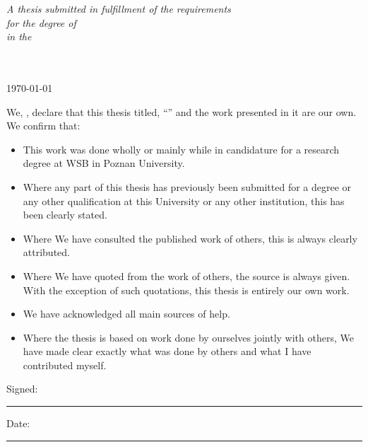 \documentclass[
    11pt,
    english, %
    singlespacing, %
    headsepline, %
    oneside, %
]{MastersDoctoralThesis} %
\begin{document}
\begin{titlepage}
\begin{center}
            \vfill

            \large \textit{A thesis submitted in fulfillment of the requirements\\ for the degree of \degreename}\\[0.3cm] %
            \textit{in the}\\[0.4cm]
            \groupname\\\deptname\\[2cm] %

            \vfill

            {\large \today}\\[4cm] %

            \vfill
        \end{center}
    \end{titlepage}


    \begin{declaration}
        \addchaptertocentry{\authorshipname} %
        \noindent We, \authorname, declare that this thesis titled, \enquote{\ttitle} and the work
        presented in it are our own.
        We confirm that:

        \begin{itemize}
            \item This work was done wholly or mainly while in candidature for a research degree at WSB in Poznan University.
            \item Where any part of this thesis has previously been submitted for a degree or any other qualification
            at this University or any other institution, this has been clearly stated.
            \item Where We have consulted the published work of others, this is always clearly attributed.
            \item Where We have quoted from the work of others, the source is always given.
            With the exception of such quotations, this thesis is entirely our own work.
            \item We have acknowledged all main sources of help.
            \item Where the thesis is based on work done by ourselves jointly with others,
            We have made clear exactly what was done by others and what I have contributed myself.\\
        \end{itemize}

        \noindent Signed: \\
        \rule[0.5em]{25em}{0.5pt} %

        \noindent Date: \\
        \rule[0.5em]{25em}{0.5pt} %
    \end{declaration}
\end{document}
